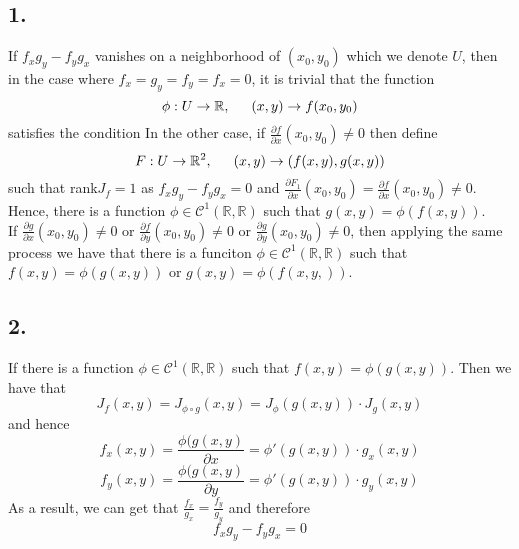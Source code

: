 \documentclass[11pt]{article}
\begin{document}
\subsection*{1.}
If $f_xg_y - f_yg_x$ vanishes on a neighborhood of $(x_0,y_0)$ which we denote $U$, 
then in the case where $f_x = g_y = f_y = f_x = 0$, it is trivial that the function 
\[
    \phi: U \to \mathbb{R}, \indent (x,y) \to f(x_0,y_0)
\]
satisfies the condition 
In the other case, if $\frac{\partial f}{\partial x}(x_0,y_0) \ne 0$ then define
\[
    F: U \to \mathbb{R}^2, \indent (x,y) \to (f(x,y), g(x,y))    
\]
such that rank$J_f = 1$ as $f_xg_y - f_yg_x = 0$ and 
$\frac{\partial F_1}{\partial x}(x_0,y_0) = \frac{\partial f}{\partial x}(x_0,y_0) \ne 0$.
Hence, there is a function $\phi \in \mathcal{C}^1(\mathbb{R}, \mathbb{R})$ such that $g(x,y) = \phi(f(x,y))$. \\
If $\frac{\partial g}{\partial x}(x_0,y_0) \ne 0$ or $\frac{\partial f}{\partial y}(x_0,y_0) \ne 0$ or $\frac{\partial g}{\partial y}(x_0,y_0) \ne 0$,
then applying the same process we have that there is a funciton $\phi \in \mathcal{C}^1(\mathbb{R},\mathbb{R})$ such that 
$f(x,y) = \phi(g(x,y))$ or $g(x,y) = \phi(f(x,y,))$. \\
\subsection*{2.}
If there is a function $\phi \in \mathcal{C}^1(\mathbb{R}, \mathbb{R})$ such that $f(x,y) = \phi(g(x,y))$.
Then we have that 
\[
    J_f(x,y) = J_{\phi \circ g}(x,y) = J_\phi(g(x,y)) \cdot J_g(x,y)    
\]
and hence 
\[
    f_x(x,y) = \frac{\phi(g(x,y)}{\partial x} = \phi'(g(x,y)) \cdot g_x(x,y)   
\]
\[
    f_y(x,y) = \frac{\phi(g(x,y)}{\partial y} = \phi'(g(x,y)) \cdot g_y(x,y)   
\]
As a result, we can get that $\frac{f_x}{g_x} = \frac{f_y}{g_y}$ and therefore
\[
    f_xg_y - f_yg_x = 0    
\]
\end{document}
